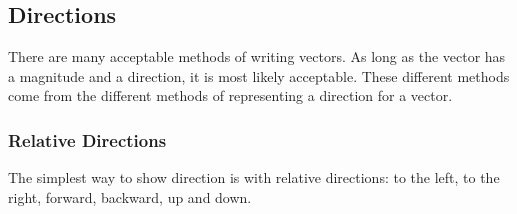 \subsection*{Directions}
            \nopagebreak
      \label{m38812*id187219}There are many acceptable methods of writing vectors. As long as the vector has a magnitude and a direction, it is most likely acceptable. These different methods come from the different methods of representing a direction for a vector.\par 
      \label{m38812*uid5}
            \subsubsection*{Relative Directions}
            \nopagebreak
        \label{m38812*id187233}The simplest way to show direction is with relative directions: to the left, to the right, forward, backward, up and down.\par 
      \label{m38812*uid6}
